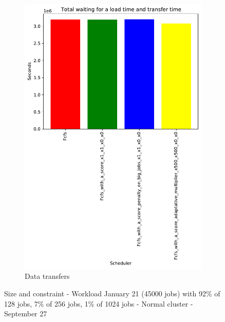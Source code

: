 \documentclass[a4paper]{article}
\begin{document}
\begin{figure}[H]
\begin{subfigure}[b]{0.4\linewidth}\centering\includegraphics[width=0.9\linewidth]{MBSS/plot/Results_FCFS_Score_Adaptative_Multiplier_2022-01-21->2022-01-21_V9271_Total_waiting_for_a_load_time_and_transfer_time_450_128_32_256_4_1024.pdf}\caption{Data transfers}\label{45}\end{subfigure}
\caption{Size and constraint - Workload January 21 (45000 jobs) with 92\% of 128 jobs, 7\% of 256 jobs, 1\% of 1024 jobs - Normal cluster - September 27}\label{49}\end{figure}
\end{document}
